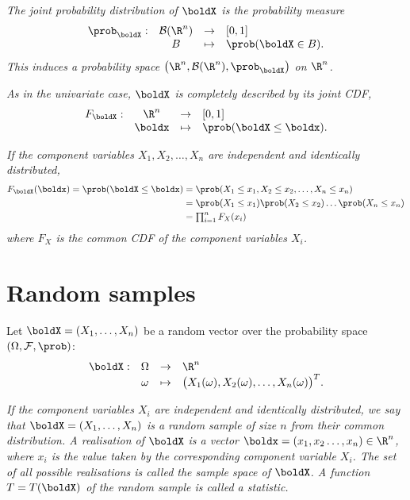 \it The \emph{joint probability distribution} of $\boldX$ is the probability measure
\[\begin{array}{rccl}
\prob_\boldX:	& \mathcal{B}(\R^n) & \to 		& [0,1] \\
			& B						& \mapsto	& \prob(\boldX\in B).
\end{array}\]
This induces a probability space $\big(\R^n,\mathcal{B}(\R^n),\prob_\boldX\big)$ on $\R^n$.

\it As in the univariate case, $\boldX$ is completely described by its \emph{joint CDF},
\[\begin{array}{rccl}
F_\boldX:	& \R^n 		& \to 		& [0,1] \\
			& \boldx	& \mapsto	& \prob(\boldX\leq \boldx).
\end{array}\]

\it If the component variables $X_1,X_2,\ldots,X_n$ are independent and identically distributed,
\begin{align*}
F_{\boldX}(\boldx) = \prob(\boldX\leq \boldx)
	& = \prob(X_1\leq x_1, X_2\leq x_2, \ldots, X_n\leq x_n) \\
	& = \prob(X_1\leq x_1)\prob(X_2\leq x_2)\ldots\prob(X_n\leq x_n) \\
	& = \textstyle\prod_{i=1}^n F_X(x_i)
\end{align*}
where $F_X$ is the common CDF of the component variables $X_i$.
\een


\section{Random samples}
Let $\boldX = (X_1,\ldots,X_n)$ be a random vector over the probability space $(\Omega,\mathcal{F},\prob)$:
\[\begin{array}{rccl}
\boldX:	& \Omega 	& \to 		& \R^n \\
		& \omega	& \mapsto	& \big(X_1(\omega),X_2(\omega),\ldots,X_n(\omega)\big)^T.
\end{array}\]

\begin{definition}
\ben
\it 
If the component variables $X_i$ are independent and identically distributed, we say that $\boldX = (X_1,\ldots,X_n)$ is a \emph{random sample of size $n$} from their common distribution.
\it A \emph{realisation} of $\boldX$ is a vector $\boldx = (x_1,x_2\ldots,x_n)\in\R^n$, where $x_i$ is the value taken by the corresponding component variable $X_i$.
\it
The set of all possible realisations is called the \emph{sample space} of $\boldX$.
\it 
A function $T=T(\boldX)$ of the random sample is called a \emph{statistic}.
\een
\end{definition}



